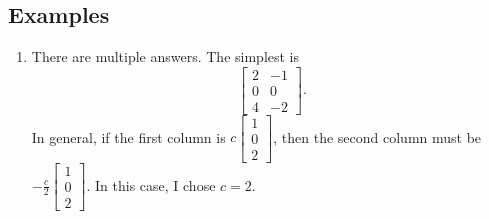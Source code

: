 \subsection{Examples}
\begin{enumerate}
	\item There are multiple answers. The simplest is \[\begin{bmatrix}2 & -1 \\ 0 & 0 \\ 4 & -2\end{bmatrix}.\] In general, if the first column is \(c\begin{bmatrix}1 \\ 0 \\ 2\end{bmatrix}\), 
		then the second column must be \(-\frac{c}{2}\begin{bmatrix}1 \\ 0 \\ 2\end{bmatrix}\). In this case, I chose \(c = 2\).
\end{enumerate}


